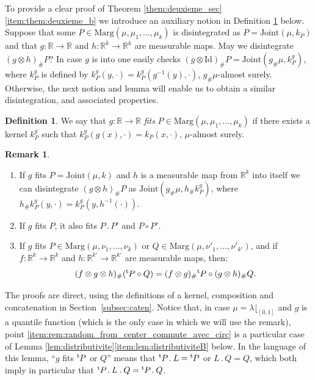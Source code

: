 \documentclass[11pt]{article}
\newcommand{\skpt}{\smallskip}
\newcommand{\ldot}{\mathbin{.}}
\theoremstyle{plain}
\theoremstyle{definition}
\newtheorem{defi}[them]{Definition}
\newtheorem{rem}[them]{Remark}
\newcommand{\id}{\mathrm{Id}}
\newcommand{\join}{\mathrm{Joint}}
\newcommand{\trans}{{}^{\mathrm{t}}\mkern-1mu}
\newcommand{\la}{\lambda}
\newcommand{\ma}{\mathrm{Marg}}
\newcommand{\R}{\mathbb{R}}
\begin{document}
To provide a clear proof of Theorem \ref{them:deuxieme_sec}\eqref{item:them:deuxieme_b} we introduce an auxiliary notion in Definition \ref{defi:fits} below.
Suppose that some $P\in \ma(\mu,\mu_1,\ldots,\mu_k)$ is disintegrated as $P=\join(\mu,k_{P})$ and that $g:\R\to \R$ and $h:\R^k\to \R^k$ are measurable maps. May we disintegrate $(g\otimes h)_\#P$? In case $g$ is into one easily checks $(g\otimes \id)_\#P=\join(g_\#\mu,k^g_P)$, where $k^g_P$ is defined by $k^g_P(y,\cdot)= k^g_P(g^{-1}(y),\cdot)$, $g_\#\mu$-almost surely. Otherwise, the next notion and lemma will enable us to obtain a similar disintegration, and associated properties.

\begin{defi}\label{defi:fits}
We say that $g:\R\to \R$ \emph{fits} $P\in \ma(\mu,\mu_1,\ldots,\mu_k)$ if there exists a kernel $k^g_P$ such that $k^g_P(g(x),\cdot)=k_{P}(x,\cdot)$, $\mu$-almost surely.
\end{defi}

\skpt
\begin{rem}\label{rem:random_from_center}\begin{enumerate}
\item
\label{item:rem:random_from_center_a} If $g$ fits $P=\join(\mu,k)$ and $h$ is a measurable map from $\R^k$ into itself we can disintegrate $(g\otimes h)_\#P$ as $\join(g_\#\mu,h_\#k^g_P)$, where $h_\#k^g_P(y,\cdot)= k^g_P(y,h^{-1}(\cdot))$.

\item
\label{item:rallonge} If $g$ fits $P$, it also fits $P\ldot P'$ and $P\circ P'$.

\item
\label{item:rem:random_from_center_commute_avec_circ} If $g$ fits $P\in \ma(\mu,\nu_1,\ldots,\nu_k)$ or $Q\in\ma(\mu,\nu'_1,\ldots,\nu'_{k'})$, and if $f:\R^k\to\R^k$ and $h:\R^{k'}\to\R^{k'}$ are measurable maps, then:
\[(f\otimes g \otimes h)_\#(\trans P\circ Q)=(f\otimes g)_\#\trans P\circ (g \otimes h)_\#Q.\]
\end{enumerate}

The proofs are direct, using the definitions of a kernel, composition and concatenation in Section~\ref{subsec:caten}. Notice that, in case $\mu=\la\lfloor_{[0,1]}$ and $g$ is a quantile function (which is the only case in which we will use the remark), point \eqref{item:rem:random_from_center_commute_avec_circ} is a particular case of Lemma \ref{lem:distributivite}\eqref{item:lem:distributiviteB} below. In the language of this lemma, ``$g$ fits $\trans P$ or $Q$'' means that $\trans P\ldot L=\trans P$ or $L\ldot Q=Q$, which both imply in particular that $\trans P\ldot L\ldot Q=\trans P\ldot Q$.
\end{rem}
\end{document}
